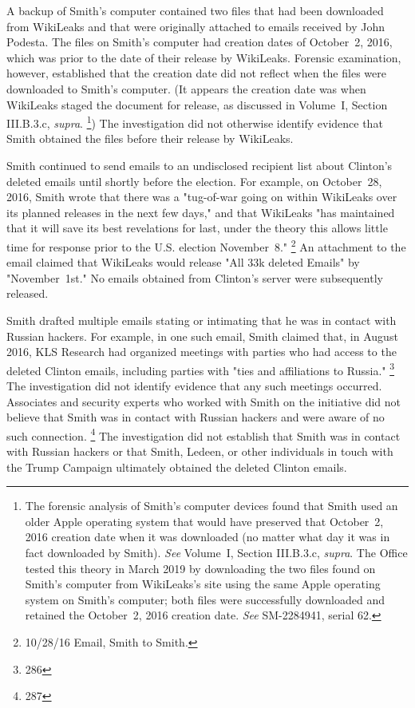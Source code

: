 A backup of Smith's computer contained two files that had been downloaded from WikiLeaks and that were originally attached to emails received by John Podesta.
The files on Smith's computer had creation dates of October~2, 2016, which was prior to the date of their release by WikiLeaks.
Forensic examination, however, established that the creation date did not reflect when the files were downloaded to Smith's computer.
(It appears the creation date was when WikiLeaks staged the document for release, as discussed in Volume~I, Section III.B.3.c, \textit{supra}.%
\footnote{The forensic analysis of Smith's computer devices found that Smith used an older Apple operating system that would have preserved that October~2, 2016 creation date when it was downloaded (no matter what day it was in fact downloaded by Smith).
\textit{See} Volume~I, Section III.B.3.c, \textit{supra}.
The Office tested this theory in March 2019 by downloading the two files found on Smith's computer from WikiLeaks's site using the same Apple operating system on Smith's computer;
both files were successfully downloaded and retained the October~2, 2016 creation date.
\textit{See} SM-2284941, serial 62.
})
The investigation did not otherwise identify evidence that Smith obtained the files before their release by WikiLeaks.

Smith continued to send emails to an undisclosed recipient list about Clinton's deleted emails until shortly before the election.
For example, on October~28, 2016, Smith wrote that there was a "tug-of-war going on within WikiLeaks over its planned releases in the next few days," and that WikiLeaks "has maintained that it will save its best revelations for last, under the theory this allows little time for response prior to the U.S. election November~8."%
\footnote{10/28/16 Email, Smith to Smith.}
An attachment to the email claimed that WikiLeaks would release "All 33k deleted Emails" by "November~1st."
No emails obtained from Clinton's server were subsequently released.

Smith drafted multiple emails stating or intimating that he was in contact with Russian hackers.
For example, in one such email, Smith claimed that, in August 2016, KLS Research had organized meetings with parties who had access to the deleted Clinton emails, including parties with "ties and affiliations to Russia."%
\footnote{286}
The investigation did not identify evidence that any such meetings occurred.
Associates and security experts who worked with Smith on the initiative did not believe that Smith was in contact with Russian hackers and were aware of no such connection.%
\footnote{287}
The investigation did not establish that Smith was in contact with Russian hackers or that Smith, Ledeen, or other individuals in touch with the Trump Campaign ultimately obtained the deleted Clinton emails.

